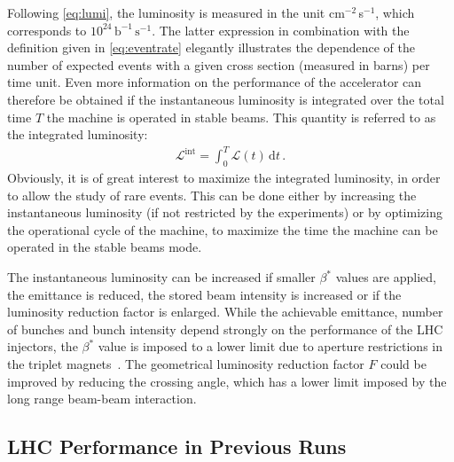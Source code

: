Following \eqref{eq:lumi}, the luminosity is measured in the unit cm$^{-2}\,$s$^{-1}$, which corresponds to $10^{24}\,\text{b}^{-1} \, \text{s}^{-1}$. The latter expression in combination with the definition given in \eqref{eq:eventrate} elegantly illustrates the dependence of the number of expected events with a given cross section (measured in barns) per time unit. Even more information on the performance of the accelerator can therefore be obtained if the instantaneous luminosity is integrated over the total time $T$ the machine is operated in stable beams. This quantity is referred to as the integrated luminosity:
%
\begin{align}
  \mathcal{L}^\text{int} = \int_{0}^T \mathcal{L}(t) \, \mathrm{d} t \, .
\end{align} 
%
Obviously, it is of great interest to maximize the integrated luminosity, in order to allow the study of rare events. This can be done either by increasing the instantaneous luminosity (if not restricted by the experiments) or by optimizing the operational cycle of the machine, to maximize the time the machine can be operated in the stable beams mode.

%

%
The instantaneous luminosity can be increased if smaller $\beta^*$ values are applied, the emittance is reduced, the stored beam intensity is increased or if the luminosity reduction factor is enlarged. While the achievable emittance, number of bunches and bunch intensity depend strongly on the performance of the LHC injectors, the $\beta^*$ value is imposed to a lower limit due to aperture restrictions in the triplet magnets~\cite{PhysRevSTAB.18.061001}. The geometrical luminosity reduction factor $F$ could be improved by reducing the crossing angle, which has a lower limit imposed by the long range beam-beam interaction.
%

 






\subsection{LHC Performance in Previous Runs} \label{chap:lhccycle}
%

